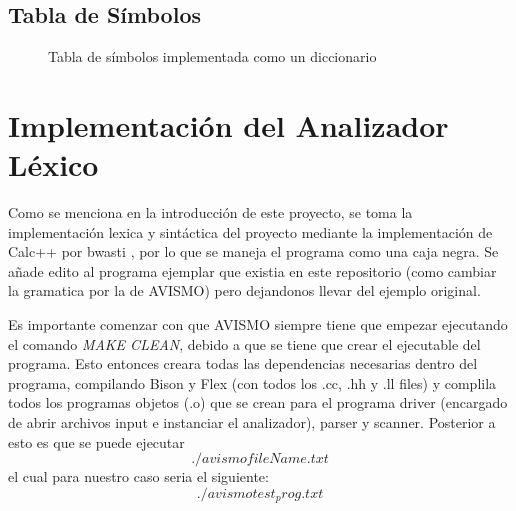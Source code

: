 \subsection{Tabla de Símbolos}

\begin{figure}[H]
    \label{fig: tablaDeSimbolos}
    \caption{Tabla de símbolos implementada como un diccionario}
\end{figure}

\section{Implementación del Analizador Léxico}


Como se menciona en la introducción de este proyecto, se toma la implementación lexica y sintáctica del proyecto mediante la implementación de Calc++ por bwasti 
\cite{wasti_bwastibison-example-calc-_2020}, por lo que se maneja el programa como una caja negra. Se añade edito al programa ejemplar que existia en este
repositorio (como cambiar la gramatica por la de AVISMO) pero dejandonos llevar del ejemplo original.

Es importante comenzar con que AVISMO siempre tiene que empezar ejecutando el comando \textit{MAKE CLEAN}, debido a que se tiene que crear el ejecutable del
programa. Esto entonces creara todas las dependencias necesarias dentro del programa, compilando Bison y Flex (con todos los .cc, .hh y .ll files) y 
complila todos los programas objetos (.o) que se crean para el programa driver (encargado de abrir archivos input e instanciar el analizador), parser y scanner. 
Posterior a esto es que se puede ejecutar \textit{$$./avismo fileName.txt$$} el cual para nuestro caso seria el siguiente: \textit{$$./avismo test_prog.txt$$}

